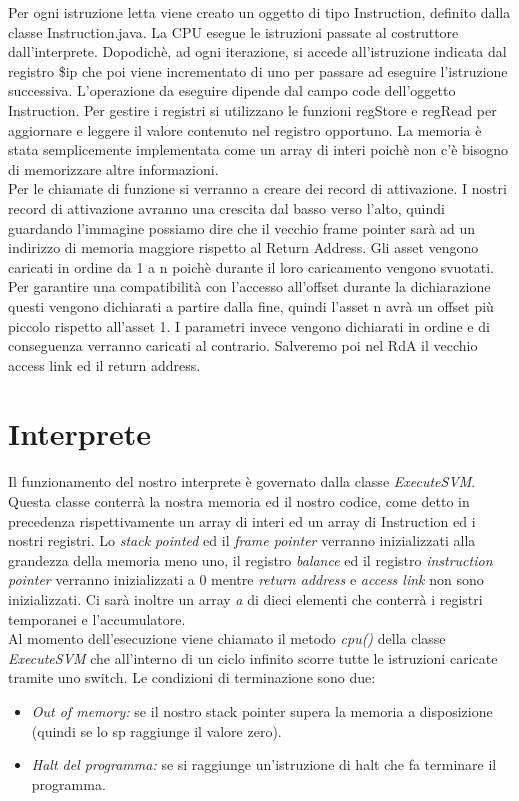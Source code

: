 \documentclass[12pt, a4paper]{report}
\begin{document}
Per ogni istruzione letta viene creato un oggetto di tipo Instruction, definito dalla classe Instruction.java. La CPU esegue le istruzioni passate al costruttore dall’interprete. Dopodichè, ad ogni iterazione, si accede all’istruzione indicata dal registro \$ip che poi viene incrementato di uno per passare ad eseguire
l’istruzione successiva. L’operazione da eseguire dipende dal campo code dell’oggetto Instruction.
Per gestire i registri si utilizzano le funzioni regStore e regRead per aggiornare e leggere il valore contenuto nel registro opportuno. La memoria è stata semplicemente implementata come un array di interi poichè non c'è bisogno di memorizzare altre informazioni.\\
Per le chiamate di funzione si verranno a creare dei record di attivazione. I nostri record di attivazione avranno una crescita dal basso verso l'alto, quindi guardando l'immagine possiamo dire che il vecchio frame pointer sarà ad un indirizzo di memoria maggiore rispetto al Return Address. Gli asset vengono caricati in ordine da 1 a n poichè durante il loro caricamento vengono svuotati. Per garantire una compatibilità con l'accesso all'offset durante la dichiarazione questi vengono dichiarati a partire dalla fine, quindi l'asset n avrà un offset più piccolo rispetto all'asset 1. I parametri invece vengono dichiarati in ordine e di conseguenza verranno caricati al contrario. Salveremo poi nel RdA il vecchio access link ed il return address.
\section{Interprete}
Il funzionamento del nostro interprete è governato dalla classe \emph{ExecuteSVM}. Questa classe conterrà la nostra memoria ed il nostro codice, come detto in precedenza rispettivamente un array di interi ed un array di Instruction ed i nostri registri. Lo \emph{stack pointed} ed il \emph{frame pointer} verranno inizializzati alla grandezza della memoria meno uno, il registro \emph{balance} ed il registro \emph{instruction pointer} verranno inizializzati a 0 mentre \emph{return address} e \emph{access link} non sono inizializzati. Ci sarà inoltre un array \emph{a} di dieci elementi che conterrà i registri temporanei e l'accumulatore. \\
Al momento dell'esecuzione viene chiamato il metodo \emph{cpu()} della classe \emph{ExecuteSVM} che all'interno di un ciclo infinito scorre tutte le istruzioni caricate tramite uno switch. Le condizioni di terminazione sono due:
\begin{itemize}
    \item \emph{Out of memory:} se il nostro stack pointer supera la memoria a disposizione (quindi se lo sp raggiunge il valore zero).
    \item \emph{Halt del programma:} se si raggiunge un'istruzione di halt che fa terminare il programma.
\end{itemize}
\end{document}
